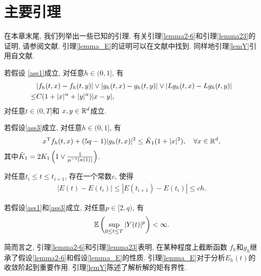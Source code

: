\section{主要引理}
在本章末尾, 我们列举出一些已知的引理. 有关引理\eqref{lemma2-6}和引理\eqref{lemma23}的证明, 请参阅文献\cite{Hu2018274}. 引理\eqref{lemma_E}的证明可以在文献\cite{Jum2016201}中找到. 同样地引理\eqref{lemY}引用自文献\cite{li2021}.
\begin{lemma}
    \label{lemma2-6}
    若假设 \ref{ass1}成立, 对任意$h\in (0,1]$, 有
    \begin{align*}
        &|f_{h}(t,x)-f_{h}(t,y)|\vee |g_{h}(t,x)-g_{h}(t,y)|\vee |Lg_{h}(t,x)-Lg_{h}(t,y)|\\
        \leq& C(1+|x|^{\alpha}+|y|^{\alpha})|x-y|,
    \end{align*}
    对任意$t\in(0,T]$和 $x,y \in \mathbb{R}^{d}$成立.
\end{lemma}

\begin{lemma}
    \label{lemma23}
     若假设\ref{ass3}成立, 对任意$h\in (0,1]$, 有
    \begin{align*}
        x^{\mathrm{T}}f_{h}(t,x) +(5q-1)|g_{h}(t,x)|^2 \leq \hat{K}_1(1+|x|^2),\quad \forall x\in \mathbb{R}^d,
    \end{align*}
    其中$\hat{K}_1=2K_1\left(1\vee \frac{1}{\mu^{-1}(\kappa(1))}\right)$.
\end{lemma}

\begin{lemma}
    \label{lemma_E}
    对任意$t_i\leq t\leq t_{i+1}$, 存在一个常数$c$, 使得
    \begin{align*}
        |E(t)-E(t_i)|\leq |E(t_{i+1})-E(t_i)|\leq ch.
    \end{align*}
\end{lemma}
\par
\begin{lemma}
    \label{lemY}
   若假设\ref{ass1}和\ref{ass3}成立, 对任意$p\in [2,q)$, 有
    \begin{align*}
        \mathbb{E} \left( \sup _{0\leq t\leq T}|Y(t)|^p \right)<\infty.
    \end{align*}
\end{lemma}
简而言之, 引理\ref{lemma2-6}和引理\ref{lemma23}表明, 在某种程度上截断函数 $f_{h}$和$g_{h}$继承了假设\ref{lemma2-6}和假设\ref{lemma_E}的性质. 引理\ref{lemma_E}对于分析$E_h(t)$的收敛阶起到重要作用. 引理\ref{lemY}陈述了解析解的矩有界性.

